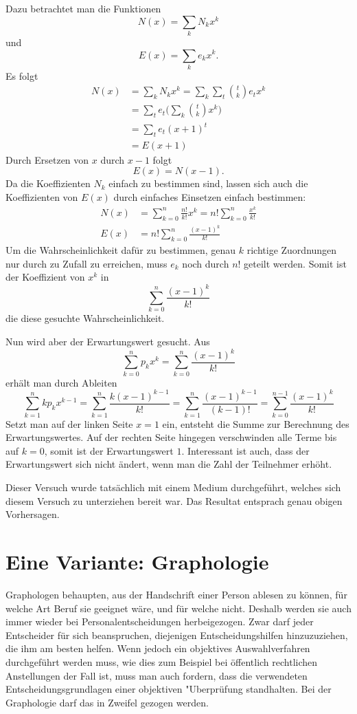 Dazu betrachtet man die Funktionen
$$N(x)=\sum_{k}N_kx^k$$
und 
$$E(x)=\sum_{k}e_kx^k.$$
Es folgt
\begin{align*}
N(x)&=\sum_kN_kx^k=\sum_k\sum_t\binom{t}{k}e_tx^k\\
&=\sum_te_t\biggl(\sum_k\binom{t}{k}x^k\biggr)\\
&=\sum_te_t(x+1)^t\\
&=E(x+1)
\end{align*}
Durch Ersetzen von $x$ durch $x-1$ folgt
$$E(x)=N(x-1).$$
Da die Koeffizienten $N_k$ einfach zu bestimmen sind, lassen sich auch
die Koeffizienten von $E(x)$ durch einfaches Einsetzen einfach
bestimmen:
\begin{align*}
N(x)&=\sum_{k=0}^n\frac{n!}{k!}x^k=n!\sum_{k=0}^n\frac{x^k}{k!}\\
E(x)&=n!\sum_{k=0}^n\frac{(x-1)^k}{k!}
\end{align*}
Um die Wahrscheinlichkeit dafür zu bestimmen, genau $k$ richtige Zuordnungen nur
durch zu Zufall zu erreichen, muss $e_k$ noch durch $n!$ geteilt werden.
Somit
ist der Koeffizient von $x^k$ in
$$\sum_{k=0}^n\frac{(x-1)^k}{k!}$$
die diese gesuchte Wahrscheinlichkeit.

Nun wird aber der Erwartungswert gesucht.
Aus
$$\sum_{k=0}^np_kx^k=\sum_{k=0}^n\frac{(x-1)^k}{k!}$$
erhält man durch Ableiten
$$
\sum_{k=1}^nkp_kx^{k-1}
=\sum_{k=1}^n\frac{k(x-1)^{k-1}}{k!}
=\sum_{k=1}^n\frac{(x-1)^{k-1}}{(k-1)!}
=\sum_{k=0}^{n-1}\frac{(x-1)^k}{k!}
$$
Setzt man auf der linken Seite $x=1$ ein, entsteht die Summe zur
Berechnung des Erwartungswertes.
Auf der rechten Seite hingegen
verschwinden alle Terme bis auf $k=0$, somit ist der Erwartungswert
$1$.
Interessant ist auch, dass der Erwartungswert sich nicht ändert,
wenn man die Zahl der Teilnehmer erhöht.

Dieser Versuch wurde tatsächlich mit einem Medium durchgeführt, welches
sich diesem Versuch zu unterziehen bereit war.
Das Resultat entsprach genau
obigen Vorhersagen.

\section{Eine Variante: Graphologie}
Graphologen behaupten, aus der Handschrift einer Person ablesen zu können,
für welche Art Beruf sie geeignet wäre, und für welche nicht.
Deshalb
werden sie auch immer wieder bei Personalentscheidungen herbeigezogen.
Zwar darf jeder Entscheider für sich beanspruchen, diejenigen Entscheidungshilfen
hinzuzuziehen, die ihm am besten helfen.
Wenn jedoch ein objektives
Auswahlverfahren durchgeführt werden muss, wie dies zum Beispiel bei
öffentlich rechtlichen Anstellungen der Fall ist, muss man auch
fordern, dass die verwendeten Entscheidungsgrundlagen einer objektiven
"Uberprüfung standhalten.
Bei der Graphologie darf das in Zweifel
gezogen werden.

